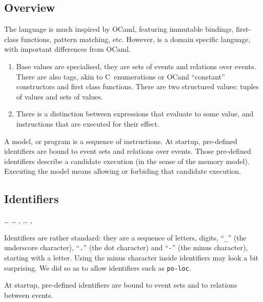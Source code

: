 \subsection{\label{overview}Overview}
The \cat{} language is much inspired by OCaml, featuring immutable bindings,
first-class functions, pattern matching, etc.
However, \cat{} is a domain specific language, with important differences
from OCaml.
\begin{enumerate}
\item Base values are specialised, they are sets of events and relations
over events. There are also tags, akin to C~enumerations or OCaml
``constant'' constructors and first class functions. 
There are two structured values: tuples of values and sets of values.
\item There is a distinction between expressions that evaluate
to some value, and instructions that are executed for their effect.
\end{enumerate}
A model, or \cat{} program is a sequence of instructions.
At startup, pre-defined identifiers are bound to event sets and relations
over events.
Those pre-defined identifiers describe a candidate execution
(in the sense of the memory model).
Executing the model means allowing or forbiding that candidate
execution.


\subsection{\label{language:identifier}Identifiers}
\begin{syntax}
 \is {} \ldots{}
\orelse  {} \ldots{}
\sep
{} \is {} \ldots{}
\sep
{} \is {} \brepet{}  \orelse {}
\orelse \T{\_} \orelse {} \orelse \T{-} \erepet
\end{syntax}
Identifiers are rather standard: they are a sequence of letters, digits,
``\texttt{\_}'' (the underscore character), ``\texttt{.}'' (the dot character)
and ``\texttt{-}'' (the minus character),
starting with a letter.
Using the minus character inside identifiers  may look a bit surprising.
We did so as to allow identifiers such as \texttt{po-loc}.

\label{sec:predef}At startup, pre-defined identifiers are bound to
event sets and to relations
between events.

